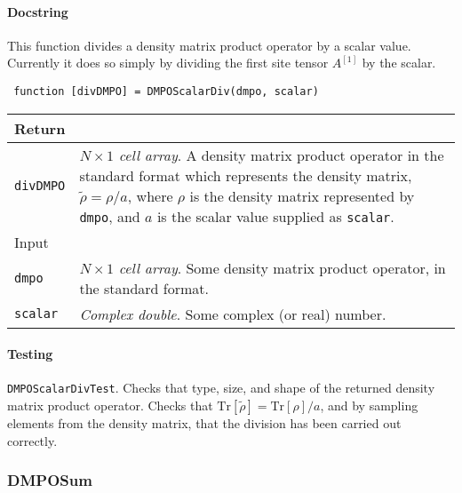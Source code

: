  \paragraph{Docstring} This function divides a density matrix product operator by a scalar value. Currently it does so simply by dividing the first site tensor \(A^{[1]}\) by the scalar.
 \begin{lstlisting}
 function [divDMPO] = DMPOScalarDiv(dmpo, scalar) \end{lstlisting}
 \begin{longtabu}{X[1,l]X[4,l]}
 \hline
 Return & \\ \hline
 \lstinline$divDMPO$ & \emph{\(N \times 1\) cell array}. A density matrix product operator in the standard format which represents the density matrix, \(\tilde{\rho} = \rho / a\), where \(\rho\) is the density matrix represented by \lstinline$dmpo$, and \(a\) is the scalar value supplied as \lstinline$scalar$. \\ \hline
 Input & \\ \hline
 \lstinline$dmpo$ & \emph{\(N \times 1\) cell array}. Some density matrix product operator, in the standard format. \\
 \lstinline$scalar$ & \emph{Complex double}. Some complex (or real) number. \\
 \hline
 \end{longtabu}
 \paragraph{Testing} \lstinline$DMPOScalarDivTest$. Checks that type, size, and shape of the returned density matrix product operator. Checks that \(\mathrm{Tr}[\tilde{\rho}] = \mathrm{Tr}[\rho] / a\), and by sampling elements from the density matrix, that the division has been carried out correctly.

 \subsubsection{DMPOSum}
